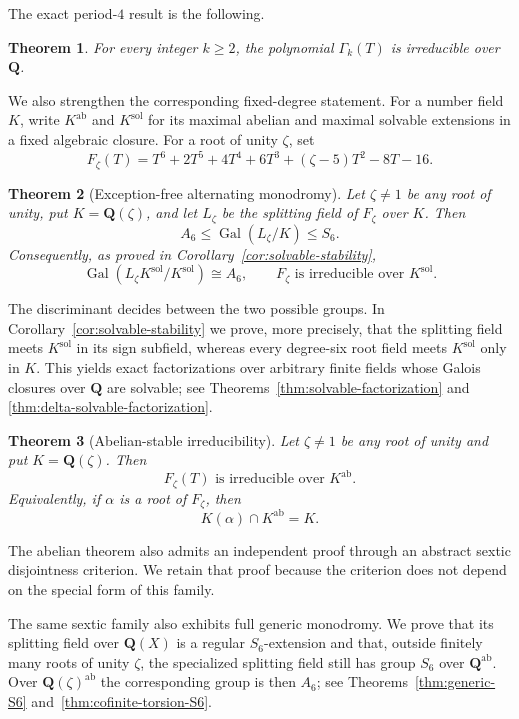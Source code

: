 \documentclass[11pt]{article}
\newtheorem{theorem}{Theorem}[section]
\newcommand{\Q}{\mathbf Q}
\newcommand{\Gal}{\operatorname{Gal}}
\begin{document}
The exact period-$4$ result is the following.

\begin{theorem}\label{thm:main}
For every integer $k\geq2$, the polynomial $\Gamma_k(T)$ is irreducible
over $\Q$.
\end{theorem}

We also strengthen the corresponding fixed-degree statement.  For a
number field $K$, write $K^{\mathrm{ab}}$ and $K^{\mathrm{sol}}$ for
its maximal abelian and maximal solvable extensions in a fixed
algebraic closure.  For a root of unity $\zeta$, set
\[
F_\zeta(T)=T^6+2T^5+4T^4+6T^3+(\zeta-5)T^2-8T-16.
\]

\begin{theorem}[Exception-free alternating monodromy]
\label{thm:alternating-monodromy}
Let $\zeta\ne1$ be any root of unity, put $K=\Q(\zeta)$, and let
$L_\zeta$ be the splitting field of $F_\zeta$ over $K$.  Then
\[
 A_6\leq\Gal(L_\zeta/K)\leq S_6.
\]
Consequently, as proved in Corollary~\ref{cor:solvable-stability},
\[
 \Gal(L_\zeta K^{\mathrm{sol}}/K^{\mathrm{sol}})\cong A_6,
 \qquad
 F_\zeta\text{ is irreducible over }K^{\mathrm{sol}}.
\]
\end{theorem}

The discriminant decides between the two possible groups.  In
Corollary~\ref{cor:solvable-stability} we prove, more precisely, that
the splitting field meets $K^{\mathrm{sol}}$ in its sign subfield,
whereas every degree-six root field meets $K^{\mathrm{sol}}$ only in
$K$.  This yields exact factorizations over arbitrary finite fields
whose Galois closures over $\Q$ are solvable; see
Theorems~\ref{thm:solvable-factorization} and
\ref{thm:delta-solvable-factorization}.

\begin{theorem}[Abelian-stable irreducibility]
\label{thm:abelian-stability}
Let $\zeta\ne1$ be any root of unity and put $K=\Q(\zeta)$.  Then
\[
 F_\zeta(T)\text{ is irreducible over }K^{\mathrm{ab}}.
\]
Equivalently, if $\alpha$ is a root of $F_\zeta$, then
\[
 K(\alpha)\cap K^{\mathrm{ab}}=K.
\]
\end{theorem}

The abelian theorem also admits an independent proof through an abstract
sextic disjointness criterion.  We retain that proof because the
criterion does not depend on the special form of this family.

The same sextic family also exhibits full generic monodromy.  We prove
that its splitting field over $\Q(X)$ is a regular $S_6$-extension and
that, outside finitely many roots of unity $\zeta$, the specialized
splitting field still has group $S_6$ over $\Q^{\mathrm{ab}}$.  Over
$\Q(\zeta)^{\mathrm{ab}}$ the corresponding group is then $A_6$; see
Theorems~\ref{thm:generic-S6} and~\ref{thm:cofinite-torsion-S6}.
\end{document}

